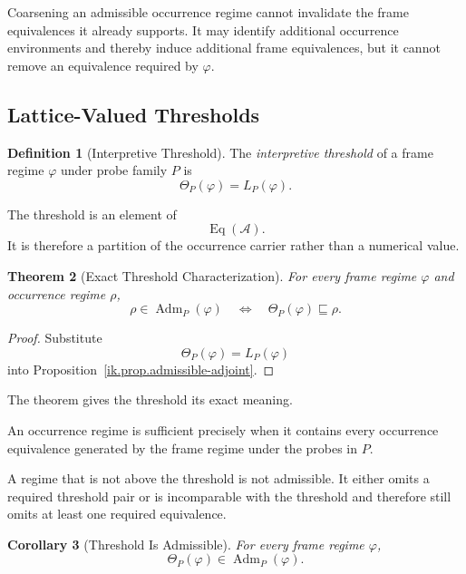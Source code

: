 \documentclass[11pt]{article}
\theoremstyle{plain}
\newtheorem{theorem}{Theorem}[section]
\newtheorem{corollary}[theorem]{Corollary}
\theoremstyle{definition}
\newtheorem{definition}[theorem]{Definition}
\theoremstyle{remark}
\begin{document}
Coarsening an admissible occurrence regime
cannot invalidate the frame equivalences it already supports.
It may identify additional occurrence environments
and thereby induce additional frame equivalences,
but it cannot remove an equivalence required by \(\varphi\).

\subsection{Lattice-Valued Thresholds}

\begin{definition}[Interpretive Threshold]
  \label{ik.def.threshold}
  The \emph{interpretive threshold}
  of a frame regime \(\varphi\)
  under probe family \(P\) is
  \[
    \Theta_P(\varphi)
    =
    L_P(\varphi).
  \]
\end{definition}

The threshold is an element of
\[
  \operatorname{Eq}(\mathcal{A}).
\]
It is therefore a partition of the occurrence carrier
rather than a numerical value.

\begin{theorem}[Exact Threshold Characterization]
  \label{ik.thm.threshold-characterization}
  For every frame regime \(\varphi\)
  and occurrence regime \(\rho\),
  \[
    \rho
    \in
    \operatorname{Adm}_P(\varphi)
    \quad\Longleftrightarrow\quad
    \Theta_P(\varphi)
    \sqsubseteq
    \rho.
  \]
\end{theorem}

\begin{proof}
  Substitute
  \[
    \Theta_P(\varphi)
    =
    L_P(\varphi)
  \]
  into Proposition~\ref{ik.prop.admissible-adjoint}.
\end{proof}

The theorem gives the threshold its exact meaning.

An occurrence regime is sufficient
precisely when it contains
every occurrence equivalence generated
by the frame regime under the probes in \(P\).

A regime that is not above the threshold
is not admissible.
It either omits a required threshold pair
or is incomparable with the threshold
and therefore still omits at least one required equivalence.

\begin{corollary}[Threshold Is Admissible]
  \label{ik.cor.threshold-admissible}
  For every frame regime \(\varphi\),
  \[
    \Theta_P(\varphi)
    \in
    \operatorname{Adm}_P(\varphi).
  \]
\end{corollary}
\end{document}
